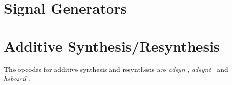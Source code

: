 \begin{comment}
\documentclass[10pt]{article}
\usepackage{fullpage, graphicx, url}
\setlength{\parskip}{1ex}
\setlength{\parindent}{0ex}
\title{Signal Generators}



\begin{tabular}{ccc}
The Alternative Csound Reference Manual & & \\
Previous & &Next

\end{tabular}

\end{comment}
\section{Signal Generators}
\section{Additive Synthesis/Resynthesis}


  The opcodes for additive synthesis and resynthesis are \emph{adsyn}
, \emph{adsynt}
, and \emph{hsboscil}
. 


\begin{comment}
\begin{tabular}{lcr}
Previous &Home &Next \\
Tuning Opcodes &Up &Basic Oscillators

\end{tabular}



\end{comment}

